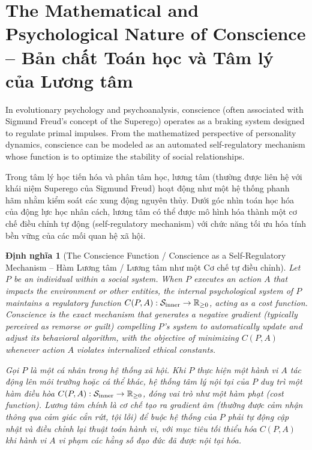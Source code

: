 \documentclass{report}
\newtheorem{dinhnghia}{Định nghĩa}
\begin{document}
\section{The Mathematical and Psychological Nature of Conscience -- Bản chất Toán học và Tâm lý của Lương tâm}

In evolutionary psychology and psychoanalysis, conscience (often associated with Sigmund Freud's concept of the Superego) operates as a braking system designed to regulate primal impulses. From the mathematized perspective of personality dynamics, conscience can be modeled as an automated self-regulatory mechanism whose function is to optimize the stability of social relationships.

Trong tâm lý học tiến hóa và phân tâm học, lương tâm (thường được liên hệ với khái niệm Superego của Sigmund Freud) hoạt động như một hệ thống phanh hãm nhằm kiểm soát các xung động nguyên thủy. Dưới góc nhìn toán học hóa của động lực học nhân cách, lương tâm có thể được mô hình hóa thành một cơ chế điều chỉnh tự động (self-regulatory mechanism) với chức năng tối ưu hóa tính bền vững của các mối quan hệ xã hội.

\begin{dinhnghia}[The Conscience Function / Conscience as a Self-Regulatory Mechanism -- Hàm Lương tâm / Lương tâm như một Cơ chế tự điều chỉnh]
	Let $P$ be an individual within a social system. When $P$ executes an action $A$ that impacts the environment or other entities, the internal psychological system of $P$ maintains a regulatory function $C(P, A): \mathcal{S}_{\rm inner} \to \mathbb{R}_{\ge 0}$, acting as a \emph{cost function}. Conscience is the exact mechanism that generates a negative gradient (typically perceived as remorse or guilt) compelling $P$'s system to automatically update and adjust its behavioral algorithm, with the objective of minimizing $C(P, A)$ whenever action $A$ violates internalized ethical constants.
	
	Gọi $P$ là một cá nhân trong hệ thống xã hội. Khi $P$ thực hiện một hành vi $A$ tác động lên môi trường hoặc cá thể khác, hệ thống tâm lý nội tại của $P$ duy trì một hàm điều hòa $C(P, A): \mathcal{S}_{\rm inner} \to \mathbb{R}_{\ge 0}$, đóng vai trò như một \emph{hàm phạt} (cost function). Lương tâm chính là cơ chế tạo ra gradient âm (thường được cảm nhận thông qua cảm giác cắn rứt, tội lỗi) để buộc hệ thống của $P$ phải tự động cập nhật và điều chỉnh lại thuật toán hành vi, với mục tiêu tối thiểu hóa $C(P, A)$ khi hành vi $A$ vi phạm các hằng số đạo đức đã được nội tại hóa.
\end{dinhnghia}
\end{document}
